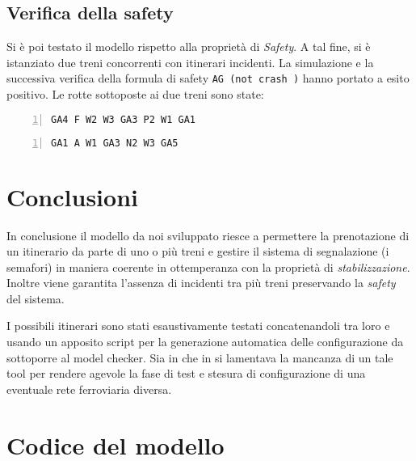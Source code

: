 \documentclass[10pt,a4paper,oneside]{report}
\begin{document}
\section{Verifica della safety}
Si è poi testato il modello rispetto alla proprietà di \emph{Safety}. A tal fine, si è istanziato due treni concorrenti con itinerari incidenti. La simulazione e la successiva verifica della formula di safety \verb!AG (not crash )! hanno portato a esito positivo. Le rotte sottoposte ai due treni sono state:

\begin{lstlisting}[numbers=left,
numberstyle=\tiny,caption={Simulazione di itinerario del primo treno},
label=lst:itinerario2]
GA4 F W2 W3 GA3 P2 W1 GA1
\end{lstlisting}
\begin{lstlisting}[numbers=left,
numberstyle=\tiny,caption={Simulazione di itinerario del secondo treno},
label=lst:itinerario3]
GA1 A W1 GA3 N2 W3 GA5
\end{lstlisting}


\chapter{Conclusioni}
\label{cap:conclusions}
In conclusione il modello da noi sviluppato riesce a permettere la prenotazione di un itinerario da parte di uno o più treni e gestire il sistema di segnalazione (i semafori) in maniera coerente in ottemperanza con la proprietà di \emph{stabilizzazione}. Inoltre viene garantita l'assenza di incidenti tra più treni preservando la \emph{safety} del sistema. 

I possibili itinerari sono stati esaustivamente testati concatenandoli tra loro e usando un apposito script per la generazione automatica delle configurazione da sottoporre al model checker. Sia in \cite{Paolieri} che in \cite{RossettoRocciolo} si lamentava la mancanza di un tale tool per rendere agevole la fase di test e stesura di configurazione di una eventuale rete ferroviaria diversa.

\appendix


\chapter{Codice del modello}




\end{document}
